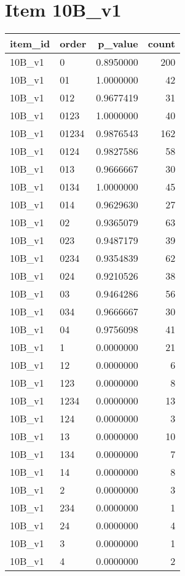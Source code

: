\documentclass[]{book}
\newenvironment{Shaded}{\begin{snugshade}}{\end{snugshade}}
\newcommand{\KeywordTok}[1]{\textcolor[rgb]{0.13,0.29,0.53}{\textbf{#1}}}
\newcommand{\StringTok}[1]{\textcolor[rgb]{0.31,0.60,0.02}{#1}}
\newcommand{\OperatorTok}[1]{\textcolor[rgb]{0.81,0.36,0.00}{\textbf{#1}}}
\newcommand{\NormalTok}[1]{#1}
\theoremstyle{definition}
\theoremstyle{definition}
\theoremstyle{definition}
\theoremstyle{remark}
\begin{document}
\section{Item 10B\_v1}\label{item-10b_v1}

\begin{Shaded}
\end{Shaded}

\begin{tabular}{l|l|r|r}
\hline
item\_id & order & p\_value & count\\
\hline
10B\_v1 & 0 & 0.8950000 & 200\\
\hline
10B\_v1 & 01 & 1.0000000 & 42\\
\hline
10B\_v1 & 012 & 0.9677419 & 31\\
\hline
10B\_v1 & 0123 & 1.0000000 & 40\\
\hline
10B\_v1 & 01234 & 0.9876543 & 162\\
\hline
10B\_v1 & 0124 & 0.9827586 & 58\\
\hline
10B\_v1 & 013 & 0.9666667 & 30\\
\hline
10B\_v1 & 0134 & 1.0000000 & 45\\
\hline
10B\_v1 & 014 & 0.9629630 & 27\\
\hline
10B\_v1 & 02 & 0.9365079 & 63\\
\hline
10B\_v1 & 023 & 0.9487179 & 39\\
\hline
10B\_v1 & 0234 & 0.9354839 & 62\\
\hline
10B\_v1 & 024 & 0.9210526 & 38\\
\hline
10B\_v1 & 03 & 0.9464286 & 56\\
\hline
10B\_v1 & 034 & 0.9666667 & 30\\
\hline
10B\_v1 & 04 & 0.9756098 & 41\\
\hline
10B\_v1 & 1 & 0.0000000 & 21\\
\hline
10B\_v1 & 12 & 0.0000000 & 6\\
\hline
10B\_v1 & 123 & 0.0000000 & 8\\
\hline
10B\_v1 & 1234 & 0.0000000 & 13\\
\hline
10B\_v1 & 124 & 0.0000000 & 3\\
\hline
10B\_v1 & 13 & 0.0000000 & 10\\
\hline
10B\_v1 & 134 & 0.0000000 & 7\\
\hline
10B\_v1 & 14 & 0.0000000 & 8\\
\hline
10B\_v1 & 2 & 0.0000000 & 3\\
\hline
10B\_v1 & 234 & 0.0000000 & 1\\
\hline
10B\_v1 & 24 & 0.0000000 & 4\\
\hline
10B\_v1 & 3 & 0.0000000 & 1\\
\hline
10B\_v1 & 4 & 0.0000000 & 2\\
\hline
\end{tabular}
\end{document}
